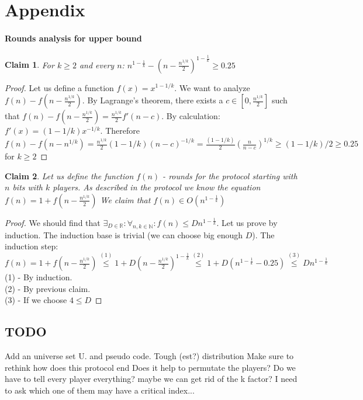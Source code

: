 \documentclass{article}
\theoremstyle{plain}
\newtheorem{claim}{Claim}
\begin{document}
\section{Appendix}
\paragraph{Rounds analysis for upper bound}
\begin{claim}
    For $k \geq 2$ and every $n$: $n^{1 - \frac{1}{k}} - (n-\frac{n^{1/k}}{2})^{1-\frac{1}{k}} \geq 0.25$
\end{claim}
\begin{proof}
    Let us define a function $f(x) = x^{1-1/k}$. We want to analyze $f(n) - f(n-\frac{n^{1/k}}{2})$. By Lagrange's theorem, there exists a $c \in [0, \frac{n^{1/k}}{2}]$ such that $f(n) - f(n-\frac{n^{1/k}}{2}) = \frac{n^{1/k}}{2} f'(n-c)$. By calculation: $f'(x) = (1-1/k)x^{-1/k}$. Therefore $f(n) -  f(n-n^{1/k}) = \frac{n^{1/k}}{2} (1-1/k) (n-c)^{-1/k} = \frac{(1-1/k)}{2} (\frac{n}{n-c})^{1/k} \geq (1-1/k)/2 \geq 0.25$ for $k \geq 2$ 
\end{proof}
\begin{claim}
    Let us define the function $f(n)$ - rounds for the protocol starting with $n$ bits with $k$ players. As described in the protocol we know the equation 
    $f(n) = 1 + f(n - \frac{n^{1/k}}{2})$ \newline
    We claim that $f(n) \in O(n^{1-\frac{1}{k}})$
\end{claim}
\begin{proof}
We should find that $ \exists_{D\in\mathbb{R}} : \forall_{n, k \in \mathbb{N}} : f(n) \leq Dn^{1-\frac{1}{k}}$. Let us prove by induction. The induction base is trivial (we can choose big enough $D$). The induction step: \newline
$f(n) = 1 + f(n - \frac{n^{1/k}}{2}) \overset{(1)}{\leq} 1 + D(n - \frac{n^{1/k}}{2})^{1-\frac{1}{k}} \overset{(2)}{\leq} 1 + D(n^{1-\frac{1}{k}}-0.25) \overset{(3)}{\leq} Dn^{1-\frac{1}{k}}$ \newline
(1) - By induction. \\
(2) - By previous claim. \\
(3) - If we choose $4 \leq D$
\end{proof}

\subsection{TODO}
Add an universe set U. and pseudo code. 
Tough (est?) distribution\newline
Make sure to rethink how does this protocol end \newline
Does it help to permutate the players? \newline
Do we have to tell every player everything? maybe we can get rid of the k factor? I need to ask which one of them may have a critical index... \newline
\end{document}
